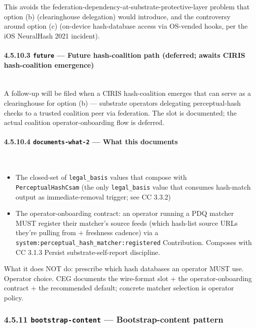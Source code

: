 \documentclass[11pt]{article}
\begin{document}
This avoids the federation-dependency-at-substrate-protective-layer problem that option (b) (clearinghouse delegation) would introduce, and the controversy around option (c) (on-device hash-database access via OS-vended hooks, per the iOS NeuralHash 2021 incident).


\paragraph{4.5.10.3 \texttt{future} — Future hash-coalition path (deferred; awaits CIRIS hash-coalition emergence)}\mbox{}\\


A follow-up will be filed when a CIRIS hash-coalition emerges that can serve as a clearinghouse for option (b) — substrate operators delegating perceptual-hash checks to a trusted coalition peer via federation. The slot is documented; the actual coalition operator-onboarding flow is deferred.


\paragraph{4.5.10.4 \texttt{documents-what-2} — What this documents}\mbox{}\\


\begin{itemize}\setlength\itemsep{0pt}
\item The closed-set of \texttt{legal\_basis} values that compose with \texttt{PerceptualHashCsam} (the only \texttt{legal\_basis} value that consumes hash-match output as immediate-removal trigger; see CC 3.3.2)
\item The operator-onboarding contract: an operator running a PDQ matcher MUST register their matcher's source feeds (which hash-list source URLs they're pulling from + freshness cadence) via a \texttt{system:perceptual\_hash\_matcher:registered} Contribution. Composes with CC 3.1.3 Persist substrate-self-report discipline.
\end{itemize}


What it does NOT do: prescribe which hash databases an operator MUST use. Operator choice. CEG documents the wire-format slot + the operator-onboarding contract + the recommended default; concrete matcher selection is operator policy.


\subsubsection*{4.5.11 \texttt{bootstrap-content} — Bootstrap-content pattern}
\end{document}
